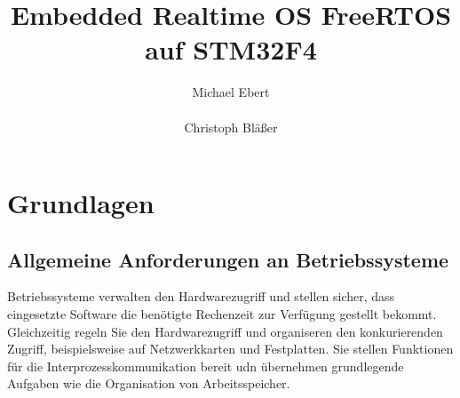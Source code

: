 \documentclass[ngerman]{seminarvorlage}
\begin{document}
\title{Embedded Realtime OS FreeRTOS auf STM32F4}
\author{
  \alignauthor Michael Ebert\\
		\\
  \alignauthor Christoph Bläßer\\
}

\maketitle
{}

\section{Grundlagen}
\subsection{Allgemeine Anforderungen an Betriebssysteme}
Betriebssysteme verwalten den Hardwarezugriff und stellen sicher, dass eingesetzte Software die benötigte Rechenzeit zur Verfügung gestellt bekommt. Gleichzeitig regeln Sie den Hardwarezugriff und organiseren den konkurierenden Zugriff, beispielsweise auf Netzwerkkarten und Festplatten. Sie stellen Funktionen für die Interprozesskommunikation bereit udn übernehmen grundlegende Aufgaben wie die Organisation von Arbeitsspeicher.
\end{document}
